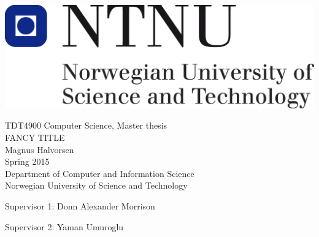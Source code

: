 \thispagestyle{empty}
\includegraphics[scale=0.3]{Figures/ntnu}
\mbox{}\\[6pc]
\begin{center}
\Large{TDT4900 Computer Science, Master thesis}\\[1pc]
\Huge{FANCY TITLE }\\[2pc]

\Large{Magnus Halvorsen}\\[1pc]
\large{Spring 2015}\\[2pc]


Department of Computer and Information Science\\
Norwegian University of Science and Technology
\end{center}
\vfill

\noindent Supervisor 1: Donn Alexander Morrison

\noindent Supervisor 2: Yaman Umuroglu